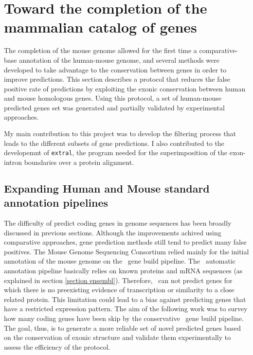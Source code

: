 \newpage


\chapter{Toward the completion of the mammalian catalog of genes}

The completion of the mouse genome allowed for the first time a
comparative-base annotation of the human-mouse genome, and several
methods were developed to take advantage to the conservation between
genes in order to improve predictions. This section describes a
protocol that reduces the false positive rate of predictions by
exploiting the exonic conservation between human and mouse homologous
genes. Using this protocol, a set of human-mouse predicted genes set
was generated and partially validated by experimental approaches.

My main contribution to this project was to develop the filtering
process that leads to the different subsets of gene predictions. I
also contributed to the developemnt of \texttt{extral}, the program
needed for the superimposition of the exon-intron boundaries over a
protein alignment.

\section{Expanding Human and Mouse standard annotation pipelines}

The difficulty of predict coding genes in genome sequences has been
broadly discussed in previous sections. Although the improvements
achived using comparative approaches, gene prediction methods still
tend to predict many false positives. The Mouse Genome Sequencing
Consortium relied mainly for the initial annotation of the mouse
genome on the \ensembl\ gene build pipeline.  The \ensembl\ automatic
annotation pipeline basically relies on known proteins and mRNA
sequences (as explained in section \ref{section ensembl}).  Therefore,
\ensembl\ can not predict genes for which there is no preexisting
evidence of transcription or similarity to a close related
protein. This limitation could lead to a bias against predicting genes
that have a restricted expression pattern. The aim of the following
work was to survey how many coding genes have been skip by the
conservative \ensembl\ gene build pipeline. The goal, thus, is to
generate a more reliable set of novel predicted genes based on the
conservation of exonic structure and validate them experimentally to
assess the efficiency of the protocol.


